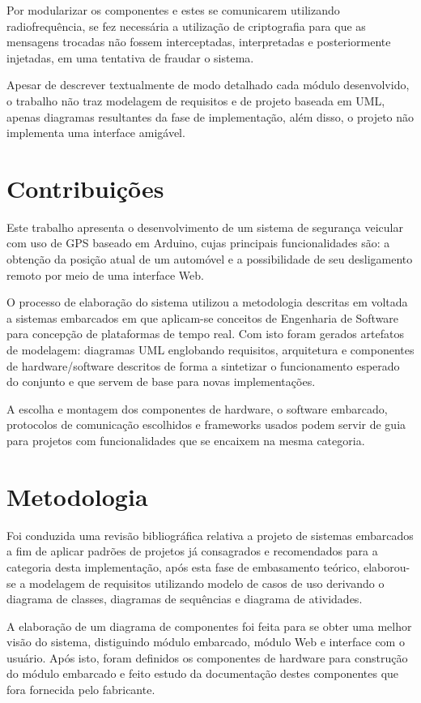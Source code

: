 Por modularizar os componentes e estes se comunicarem utilizando radiofrequência,
se fez necessária a utilização de criptografia para que as mensagens trocadas não 
fossem interceptadas, interpretadas e posteriormente injetadas, em uma tentativa 
de fraudar o sistema. 

Apesar de descrever textualmente de modo detalhado cada módulo desenvolvido, o trabalho não traz modelagem de requisitos e de projeto baseada em UML, apenas diagramas resultantes da fase de implementação, além disso, o projeto não implementa uma interface amigável.


\section{Contribui\c{c}\~{o}es}

Este trabalho apresenta o desenvolvimento de um sistema de segurança veicular com uso de GPS baseado em Arduino, cujas principais funcionalidades são: a obtenção da posição atual de um automóvel e a possibilidade de seu desligamento remoto por meio de uma interface Web.

O processo de elaboração do sistema utilizou a metodologia descritas em \textcite{Wolf:2001} voltada a sistemas embarcados em que aplicam-se  conceitos de Engenharia de Software para concepção de plataformas de tempo real. Com isto foram gerados artefatos de modelagem: diagramas UML englobando requisitos, arquitetura e componentes de hardware/software descritos de forma a sintetizar o funcionamento esperado do conjunto e que servem de base para novas implementações.

A escolha e montagem dos componentes de hardware, o software embarcado, protocolos de comunicação escolhidos e frameworks usados podem servir de guia para projetos com funcionalidades que se encaixem na mesma categoria.  

\section{Metodologia}

Foi conduzida uma revisão bibliográfica relativa a projeto de sistemas
embarcados a fim de aplicar padrões de projetos já consagrados e recomendados para a categoria desta implementação, após esta fase de embasamento teórico, elaborou-se a modelagem de requisitos utilizando modelo de casos de uso derivando o diagrama de classes, diagramas de sequências e diagrama de atividades.

A elaboração de um diagrama de componentes foi feita para se obter uma melhor visão do sistema, distiguindo módulo embarcado, módulo Web e interface 
com o usuário. Após isto, foram definidos os componentes de hardware
para construção do módulo embarcado e feito estudo da documentação destes componentes que fora fornecida pelo fabricante. 

